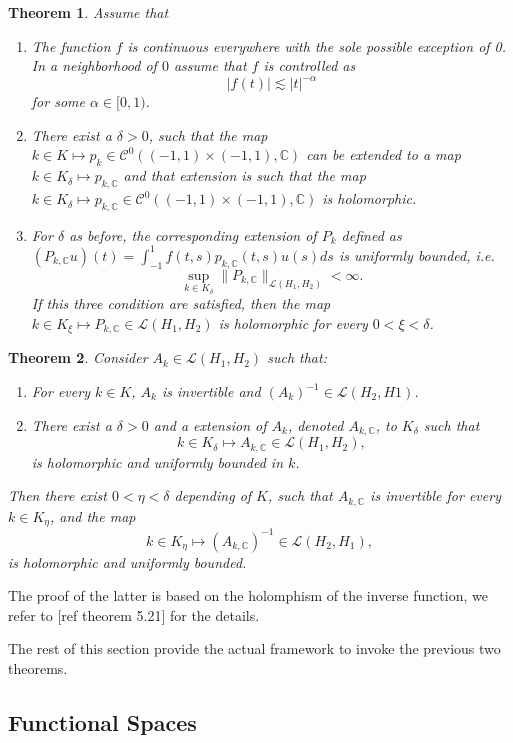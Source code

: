\documentclass{article}
\newtheorem{theorem}{Theorem}[section]
\newcommand{\todo}[1]{{\color{red}[#1]}}
\newcommand{\IC}{{\mathbb C}}
\newcommand{\cmspace}[3]{\mathcal{C}^{#1} \left( #2, #3 \right)}
\begin{document}
\begin{theorem} \label{thrm:abstractholm}
Assume that 
\begin{enumerate}
\item 
The function $f$ is continuous everywhere with the sole possible  exception of 0. In a neighborhood of $0$ assume that $f$ is controlled as 
$$|f(t)| \lesssim| t|^{-\alpha}$$
for some $\alpha \in [0,1)$. 
\item 
There exist a $\delta >0$, such that the map $k \in K \mapsto p_k \in \cmspace{0}{(-1,1)\times(-1,1)}{\IC}$ can be extended to a map $k \in K_\delta \mapsto p_{k,\IC}$ and that extension is such that 
the map $k \in K_\delta \mapsto p_{k,\IC } \in \cmspace{0}{(-1,1)\times(-1,1)}{\IC}$ is holomorphic. 
\item 
For $\delta$ as before, the corresponding extension of $P_k$ defined as $(P_{k,\IC}u)(t) = \int_{-1}^{1} f(t,s) p_{k,\IC}(t,s) u(s) ds$ is uniformly bounded, i.e. 
$$ \sup_{k \in K_\delta} \| P_{k,\IC} \|_{\mathcal{L}(H_1,H_2)}< \infty.$$
If this three condition are satisfied, then the map $k \in K_\xi \mapsto P_{k, \IC} \in \mathcal{L}(H_1,H_2)$ is holomorphic for every $0< \xi<\delta$.  
\end{enumerate}
\end{theorem}

\begin{theorem}
\label{thrm:abtractinverse}
Consider $A_k \in \mathcal{L}(H_1,H_2)$ such that: 
\begin{enumerate}
\item 
For every $k \in K$, $A_k$ is invertible and $(A_k)^{-1} \in \mathcal{L}(H_2,H1)$. 
\item 
There exist a $\delta >0$ and a extension of $A_k$, denoted $A_{k,\IC}$, to $K_\delta$ such that 
$$k \in K_\delta \mapsto A_{k,\IC} \in \mathcal{L}(H_1,H_2),$$
 is holomorphic and uniformly bounded in $k$. 
\end{enumerate}
Then there exist $0<\eta<\delta$ depending of $K$, such that 
$A_{k,\IC}$ is invertible for every $k \in K_\eta$, and the map 
$$k \in K_\eta \mapsto (A_{k,\IC})^{-1} \in \mathcal{L}(H_2,H_1),$$ is holomorphic and uniformly bounded. 
\end{theorem} 
The proof of the latter is based on the holomphism of the inverse function, we refer to \todo{ref theorem 5.21} for the details.

The rest of this section provide the actual framework to invoke the previous two theorems. 
\subsection{Functional Spaces}
\end{document}
